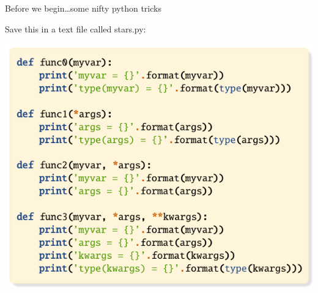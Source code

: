 \documentclass[aspectratio=169] {beamer}
\begin{document}
\begin{frame}[fragile]{Before we begin\dots some nifty python tricks}

  Save this in a text file called stars.py:
  
  \includegraphics[scale=.85]{stars.pdf}
\end{frame}
\end{document}
